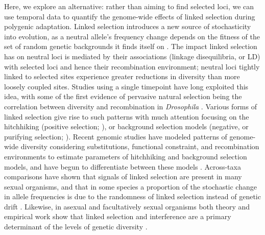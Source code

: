 \documentclass[11pt]{article}
\begin{document}
Here, we explore an alternative: rather than aiming to find selected loci, we
can use temporal data to quantify the genome-wide effects of linked selection
during polygenic adaptation. Linked selection introduces a new source of
stochasticity into evolution, as a neutral allele's frequency change depends on
the fitness of the set of random genetic backgrounds it finds itself on
\parencite{Gillespie2000-mh}. The impact linked selection has on neutral loci
is mediated by their associations (linkage disequilibria, or LD) with selected
loci and hence their recombination environment; neutral loci tightly linked to
selected sites experience greater reductions in diversity than more loosely
coupled sites. Studies using a single timepoint have long exploited this idea,
with some of the first evidence of pervasive natural selection being the
correlation between diversity and recombination in \emph{Drosophila}
\parencite{Aguade1989-jx,Begun1992-ey}. Various forms of linked selection give
rise to such patterns with much attention focusing on the hitchhiking (positive
selection; \cite{Maynard_Smith1974-lc}), or background selection models
(negative, or purifying selection; \cite{Charlesworth1993-gb,Hudson1995-xc}).
Recent genomic studies have modeled patterns of genome-wide diversity
considering substitutions, functional constraint, and recombination
environments to estimate parameters of hitchhiking and background selection
models, and have begun to differentiate between these models
\parencite{McVicker2009-ax,Hernandez2011-gs,Elyashiv2016-vt}.  Across-taxa
comparisons have shown that signals of linked selection are present in many
sexual organisms, and that in some species a proportion of the stochastic
change in allele frequencies is due to the randomness of linked selection
instead of genetic drift
\parencite{Cutter2013-ba,Corbett-Detig2015-gt,Coop2016-gx}. Likewise, in
asexual and facultatively sexual organisms both theory and empirical work show
that linked selection and interference are a primary determinant of the levels
of genetic diversity
\parencite{Neher2011-fy,Neher2013-dz,Good2017-om,Good2014-yz}.
\end{document}
